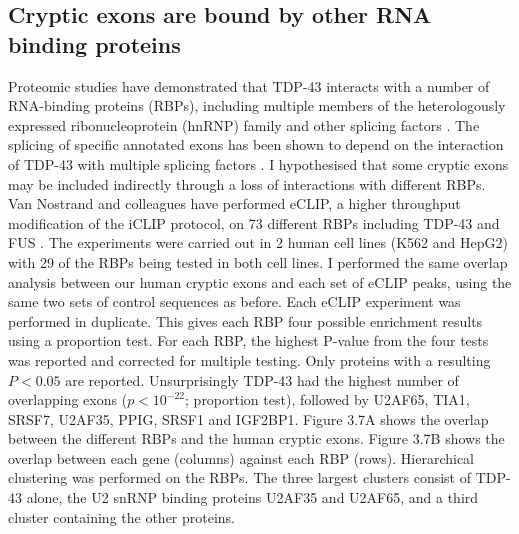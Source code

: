 \subsection{Cryptic exons are bound by other RNA binding proteins}
Proteomic studies have demonstrated that TDP-43 interacts with a number of RNA-binding proteins (RBPs), including multiple members of the heterologously expressed ribonucleoprotein (hnRNP) family and other splicing factors \citep{Blokhuis2016-hw,Ling2010-sr,Freibaum2010-hw}. The splicing of specific annotated exons has been shown to depend on the interaction of TDP-43 with multiple splicing factors \citep{Mohagheghi2016-zf}.  I hypothesised that some cryptic exons may be included indirectly through a loss of interactions with different RBPs. Van Nostrand and colleagues have performed eCLIP, a higher throughput modification of the iCLIP protocol, on 73 different RBPs including TDP-43 and FUS \citep{Van_Nostrand2016-su}. The experiments were carried out in 2 human cell lines (K562 and HepG2) with 29 of the RBPs being tested in both cell lines. I performed the same overlap analysis between our human cryptic exons and each set of eCLIP peaks, using the same two sets of control sequences as before. Each eCLIP experiment was performed in duplicate. This gives each RBP four possible enrichment results using a proportion test. For each RBP, the highest P-value from the four tests was reported and corrected for multiple testing. Only proteins with a resulting $P < 0.05$ are reported. Unsurprisingly TDP-43 had the highest number of overlapping exons ($p < 10^{-22}$; proportion test), followed by U2AF65, TIA1, SRSF7, U2AF35, PPIG, SRSF1 and IGF2BP1. Figure 3.7A shows the overlap between the different RBPs and the human cryptic exons. Figure 3.7B shows the overlap between each gene (columns) against each RBP (rows). Hierarchical clustering was performed on the RBPs. The three largest clusters consist  of TDP-43 alone, the U2 snRNP binding proteins U2AF35 and U2AF65, and a third cluster containing the other proteins. 

